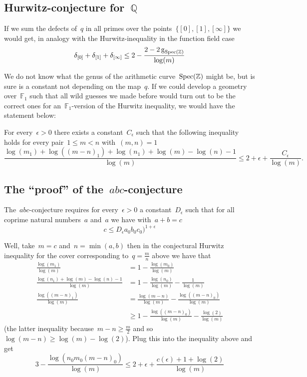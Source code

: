 \subsection{Hurwitz-conjecture for~$\mathbb{Q}$}

If we sum the defects of~$q$ in all primes over the points~$\{ [0],[1],[\infty] \}$ we would get, in analogy with the Hurwitz-inequality in the function field case
\begin{equation}
  \delta_{[0]}+\delta_{[1]}+\delta_{[\infty]} \leq 2 - \frac{2 - 2\operatorname{g}_{\operatorname{Spec}(\mathbb{Z})}}{\log(m)}
\end{equation}

We do not know what the genus of the arithmetic curve~$\operatorname{Spec}(\mathbb{Z})$ might be, but is sure is a constant not depending on the map~$q$. If we could develop a geometry over~$\mathbb{F}_1$ such that all wild guesses we made before would turn out to be the correct ones for an~$\mathbb{F}_1$-version of the Hurwitz inequality, we would have the statement below:

For every~$\epsilon > 0$ there exists a constant~$C_\epsilon$ such that the following inequality holds for every pair~$1 \leq m < n$ with~$(m,n)=1$
\begin{equation}
  \frac{\log(m_1) + \log((m-n)_1) + \log(n_1) + \log(m)-\log(n)-1}{\log(m)} \leq 2 + \epsilon + \frac{C_\epsilon}{\log(m)}.
\end{equation}

\subsection{The ``proof'' of the~$abc$-conjecture}

The~$abc$-conjecture requires for every~$\epsilon > 0$ a constant~$D_\epsilon$ such that for all coprime natural numbers~$a$ and~$a$ we have with~$a+b=c$
\begin{equation}
c \leq D_\epsilon a_0b_0c_0)^{1+\epsilon}
\end{equation}

Well, take~$m=c$ and~$n=\min(a,b)$ then in the conjectural Hurwitz inequality for the cover corresponding to~$q=\frac{m}{n}$ above we have that
\begin{equation}
  \begin{aligned}
    \frac{\log(m_1)}{\log(m)} &= 1 - \frac{\log(m_0)}{\log(m)} \\
    \frac{\log(n_1)+\log(m)-\log(n)-1}{\log(m)} &= 1 - \frac{\log(n_0)}{\log(m)} - \frac{1}{\log(m)} \\
    \frac{\log((m-n)_1)}{\log(m)}&=\frac{\log(m-n)}{\log(m)}-\frac{\log((m-n)_0)}{\log(m)} \\
    &\geq 1 - \frac{\log((m-n)_0)}{\log(m)} - \frac{\log(2)}{\log(m)}
  \end{aligned}
\end{equation}
(the latter inequality because~$m-n \geq \frac{m}{2}$ and so~$\log(m-n) \geq \log(m)-\log(2)$). Plug this into the inequality above and get
\begin{equation}
  3-\frac{\log(n_0m_0(m-n)_0)}{\log(m)} \leq 2 + \epsilon + \frac{c(\epsilon) + 1 + \log(2)}{\log(m)}
\end{equation}

